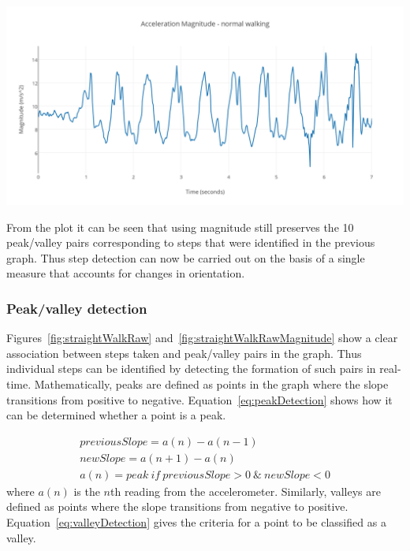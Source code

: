 \documentclass[12pt,a4paper]{report}
\begin{document}
\begin{center}
\includegraphics[scale=0.9]{images/straightWalkRawMagnitude.png}
\label{fig:straightWalkRawMagnitude}
\end{center}

From the plot it can be seen that using magnitude still preserves the 10 peak/valley pairs corresponding to steps that were identified in the previous graph. Thus step detection can now be carried out on the basis of a single measure that accounts for changes in orientation. 

\subsubsection{Peak/valley detection}
\label{sec:peakValley}

Figures~\ref{fig:straightWalkRaw} and~\ref{fig:straightWalkRawMagnitude} show a clear association between steps taken and peak/valley pairs in the graph. Thus individual steps can be identified by detecting the formation of such pairs in real-time. Mathematically, peaks are defined as points in the graph where the slope transitions from positive to negative. Equation~\ref{eq:peakDetection} shows how it can be determined whether a point is a peak. 

\begin{equation}\label{eq:peakDetection}
\begin{split}
previousSlope = a(n) - a(n-1) \\
newSlope = a(n+1) - a(n) \\
a(n) = peak\ if\ previousSlope > 0\ \&\ newSlope < 0
\end{split}
\end{equation}
where $a(n)$ is the $n$th reading from the accelerometer. Similarly, valleys are defined as points where the slope transitions from negative to positive. Equation~\ref{eq:valleyDetection} gives the criteria for a point to be classified as a valley. 
\end{document}
